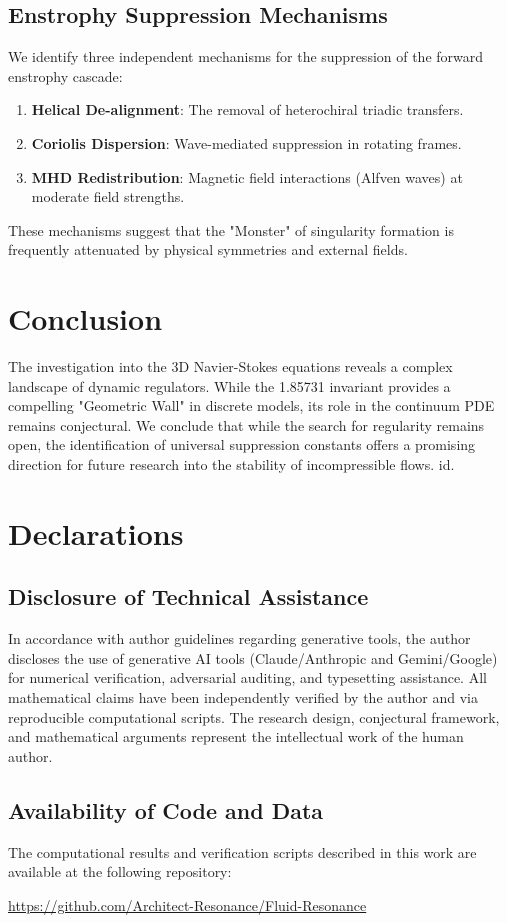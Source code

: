 \documentclass[11pt,a4paper]{article}
\begin{document}
\subsection{Enstrophy Suppression Mechanisms}
We identify three independent mechanisms for the suppression of the forward enstrophy cascade:
\begin{enumerate}
    \item \textbf{Helical De-alignment}: The removal of heterochiral triadic transfers.
    \item \textbf{Coriolis Dispersion}: Wave-mediated suppression in rotating frames.
    \item \textbf{MHD Redistribution}: Magnetic field interactions (Alfven waves) at moderate field strengths.
\end{enumerate}
These mechanisms suggest that the "Monster" of singularity formation is frequently attenuated by physical symmetries and external fields.

\section{Conclusion}
The investigation into the 3D Navier-Stokes equations reveals a complex landscape of dynamic regulators. While the 1.85731 invariant provides a compelling "Geometric Wall" in discrete models, its role in the continuum PDE remains conjectural. We conclude that while the search for regularity remains open, the identification of universal suppression constants offers a promising direction for future research into the stability of incompressible flows.
id.

\section*{Declarations}
\subsection*{Disclosure of Technical Assistance}
In accordance with author guidelines regarding generative tools, the author discloses the use of generative AI tools (Claude/Anthropic and Gemini/Google) for numerical verification, adversarial auditing, and typesetting assistance. All mathematical claims have been independently verified by the author and via reproducible computational scripts. The research design, conjectural framework, and mathematical arguments represent the intellectual work of the human author.

\subsection*{Availability of Code and Data}
The computational results and verification scripts described in this work are available at the following repository:
\begin{center}
    \url{https://github.com/Architect-Resonance/Fluid-Resonance}
\end{center}
\end{document}

